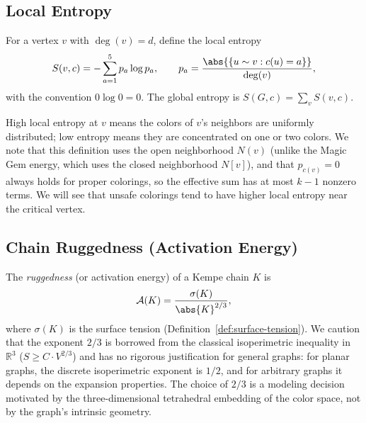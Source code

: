 \subsection{Local Entropy}\label{sec:entropy}

\begin{definition}\label{def:entropy}
For a vertex $v$ with $\deg(v) = d$, define the local entropy
\begin{equation}\label{eq:entropy}
  S(v, c) = -\sum_{a=1}^{5} p_a \log p_a,
  \qquad
  p_a = \frac{\abs{\{u \sim v : c(u) = a\}}}{\deg(v)},
\end{equation}
with the convention $0 \log 0 = 0$. The global entropy is
$S(G, c) = \sum_v S(v, c)$.
\end{definition}

High local entropy at $v$ means the colors of $v$'s neighbors are
uniformly distributed; low entropy means they are concentrated on one
or two colors. We note that this definition uses the open neighborhood
$N(v)$ (unlike the Magic Gem energy, which uses the closed
neighborhood $N[v]$), and that $p_{c(v)} = 0$ always holds for proper
colorings, so the effective sum has at most $k - 1$ nonzero terms.
We will see that unsafe colorings tend to have higher local entropy
near the critical vertex.

\subsection{Chain Ruggedness (Activation Energy)}
\label{sec:ruggedness}

\begin{definition}\label{def:ruggedness}
The \emph{ruggedness} (or activation energy) of a Kempe chain $K$ is
\begin{equation}\label{eq:ruggedness}
  \mathcal{A}(K) = \frac{\sigma(K)}{\abs{K}^{2/3}},
\end{equation}
where $\sigma(K)$ is the surface tension
(Definition~\ref{def:surface-tension}). We caution that the exponent
$2/3$ is borrowed from the classical isoperimetric inequality in
$\mathbb{R}^3$ ($S \geq C \cdot V^{2/3}$) and has no rigorous
justification for general graphs: for planar graphs, the discrete
isoperimetric exponent is $1/2$, and for arbitrary graphs it depends
on the expansion properties. The choice of $2/3$ is a modeling
decision motivated by the three-dimensional tetrahedral embedding
of the color space, not by the graph's intrinsic geometry.
\end{definition}


